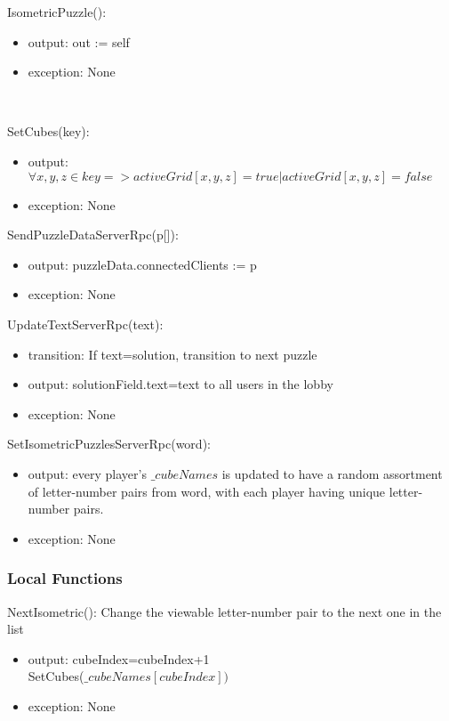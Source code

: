 \documentclass[12pt, titlepage]{article}
\begin{document}
\noindent IsometricPuzzle():
\begin{itemize}
\item output: out := self
\item exception: None
\end{itemize}\

\noindent SetCubes(key):
\begin{itemize}
\item output: $\forall x,y,z \in key => activeGrid[x,y,z]=true|activeGrid[x,y,z]=false$
\item exception: None
\end{itemize}

\noindent SendPuzzleDataServerRpc(p[]):
\begin{itemize}
\item output: puzzleData.connectedClients := p
\item exception: None
\end{itemize}

\noindent UpdateTextServerRpc(text):
\begin{itemize}
\item transition: If text=solution, transition to next puzzle
\item output: solutionField.text=text to all users in the lobby
\item exception: None
\end{itemize}

\noindent SetIsometricPuzzlesServerRpc(word):
\begin{itemize}
\item output: every player's $\_cubeNames$ is updated to have a random assortment of letter-number pairs from word, with each player having unique letter-number pairs. 
\item exception: None
\end{itemize}


\subsubsection{Local Functions}

NextIsometric(): Change the viewable letter-number pair to the next one in the list
\begin{itemize}
    \item output: cubeIndex=cubeIndex+1\\
    SetCubes($\_cubeNames[cubeIndex])$
    \item exception: None
\end{itemize}
\end{document}
